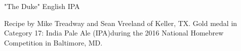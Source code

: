 \begin{recipe}{"The Duke" English IPA} %

\begin{aboutblock}
Recipe by Mike Treadway and Sean Vreeland of Keller, TX. Gold medal in Category
17: India Pale Ale (IPA)during the 2016 National Homebrew Competition in Baltimore, MD. \sourceaha
\end{aboutblock}


\begin{methodandtiming}

\begin{mashsteps}
\end{mashsteps}

\begin{fermentationsteps}
\end{fermentationsteps}

\end{methodandtiming}

\recipebreak

\begin{ingredientsblock}

\begin{malts}
\end{malts}

\begin{hops}
\end{hops}


\end{ingredientsblock}

\end{recipe}
